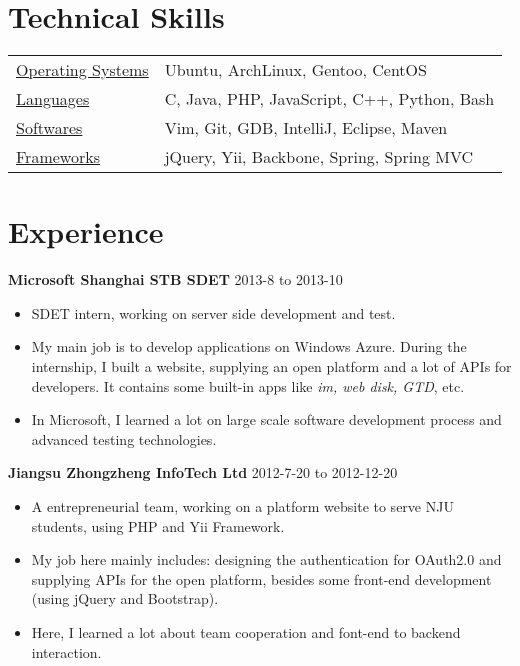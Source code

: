 \documentclass[margin]{res}
\begin{document}
 

\address{ Qichao Zhang \\ }
\address{ Nanjing University Software Institute, 2010,  Bachelor\\ (+86) 152-9838-8316  \\ \href{http://lecoding.com}{http://lecoding.com} \\ 
\href{mailto:njuzhangqichao@gmail.com}{njuzhangqichao@gmail.com} }

 
\begin{resume} 
 
\section{Technical Skills} 
   \begin{tabular}{l p{3in}}
      \underline{Operating Systems} &  Ubuntu, ArchLinux, Gentoo, CentOS \\
      \underline{Languages} &  C, Java, PHP, JavaScript, C++, Python, Bash \\
      \underline{Softwares} & Vim, Git, GDB, IntelliJ, Eclipse, Maven \\
      \underline{Frameworks} & jQuery, Yii, Backbone, Spring, Spring MVC
 \end{tabular}

\section{Experience} 
{\bf Microsoft Shanghai STB SDET} \hfill 2013-8 to 2013-10
\begin{itemize} \itemsep -2pt 
  \item SDET intern, working on server side development and test. 
  \item My main job is to develop applications on Windows Azure. During the internship, I built a website, supplying an open platform and a lot of APIs for developers. It contains some built-in apps like {\it im, web disk, GTD}, etc.
\item In Microsoft, I learned a lot on large scale software development process and advanced testing technologies.
\end{itemize}

{\bf Jiangsu Zhongzheng InfoTech Ltd} \hfill 2012-7-20 to 2012-12-20 
\begin{itemize} \itemsep -2pt 
\item A entrepreneurial team, working on a platform website to serve NJU students, using PHP and Yii Framework.
\item My job here mainly includes: designing the authentication for OAuth2.0 and supplying APIs for the open platform, besides some front-end development (using jQuery and Bootstrap).
\item Here, I learned a lot about team cooperation and font-end to backend interaction.
\end{itemize}


\end{resume}
\end{document}
